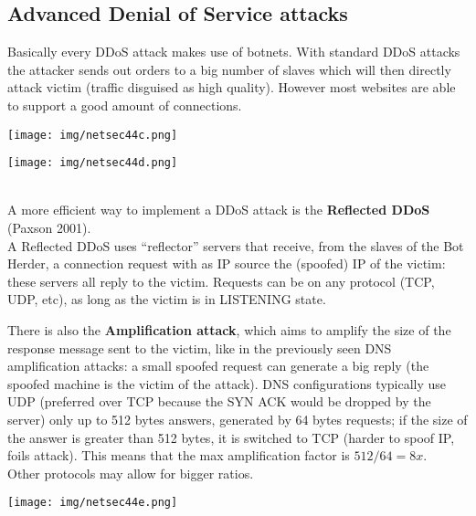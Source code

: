 \documentclass[a4paper, 10pt, titlepage]{article}
\begin{document}
\subsection{Advanced Denial of Service attacks}
Basically every DDoS attack makes use of botnets. With standard DDoS attacks the attacker sends out orders to a big number of slaves which will then directly attack victim (traffic disguised as high quality). However most websites are able to support a good amount of connections.\medskip\\
\begin{minipage}{0.48\textwidth} 
\begin{center}
	\texttt{[image: img/netsec44c.png]}
\end{center}
\end{minipage}
\hfill \vline
\begin{minipage}{0.5\textwidth}
	\begin{center}
		\texttt{[image: img/netsec44d.png]}
	\end{center}
\end{minipage} \medskip\\
A more efficient way to implement a DDoS attack is the \textbf{Reflected DDoS} (Paxson 2001). \\
A Reflected DDoS uses “reflector” servers that receive, from the slaves of the Bot Herder, a connection request with as IP source the (spoofed) IP of the victim: these servers all reply to the victim. Requests can be on any protocol (TCP, UDP, etc), as long as the victim is in LISTENING state. \medskip\\
\begin{minipage}{0.65\textwidth} 
There is also the \textbf{Amplification attack}, which aims to amplify the size of the response message sent to the victim, like in the previously seen DNS amplification attacks: a small spoofed request can generate a big reply (the spoofed machine is the victim of the attack). DNS configurations typically use UDP (preferred over TCP because the SYN ACK would be dropped by the server) only up to 512 bytes answers, generated by 64 bytes requests; if the size of the answer is greater than 512 bytes, it is switched to TCP (harder to spoof IP, foils attack). This means that the max amplification factor is $512/64=8x$.\\ Other protocols may allow for bigger ratios.

\end{minipage}
\hfill
\begin{minipage}{0.35\textwidth}
	\begin{center}
		\texttt{[image: img/netsec44e.png]}
	\end{center}
\end{minipage}
\end{document}
